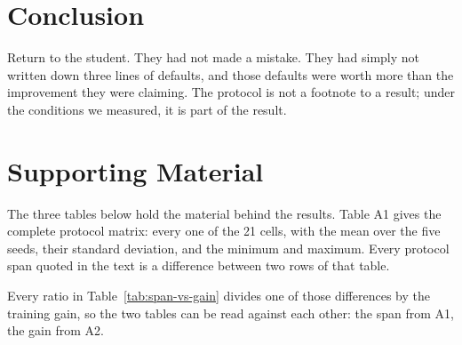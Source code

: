 \documentclass[10pt,twocolumn]{article}
\begin{document}
\section{Conclusion}

Return to the student. They had not made a mistake. They had simply not
written down three lines of defaults, and those defaults were worth more
than the improvement they were claiming. The protocol is not a footnote to a
result; under the conditions we measured, it is part of the result.

%
\appendix
\renewcommand{\thetable}{A\arabic{table}}
\setcounter{table}{0}

\section*{Supporting Material}

The three tables below hold the material behind the results. Table A1 gives
the complete protocol matrix: every one of the 21 cells, with the mean over
the five seeds, their standard deviation, and the minimum and maximum. Every
protocol span quoted in the text is a difference between two rows of that
table.

Every ratio in Table~\ref{tab:span-vs-gain} divides one of those differences
by the training gain, so the two tables can be read against each other: the
span from A1, the gain from A2.
\end{document}
